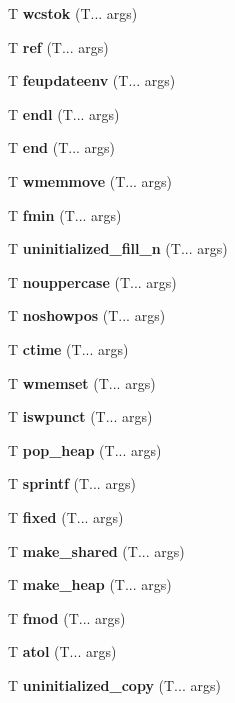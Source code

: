 \begin{DoxyCompactItemize}
T \textbf{ wcstok} (T... args)
\item 
\mbox{\label{ref}} 
T \textbf{ ref} (T... args)
\item 
\mbox{\label{feupdateenv}} 
T \textbf{ feupdateenv} (T... args)
\item 
\mbox{\label{endl}} 
T \textbf{ endl} (T... args)
\item 
\mbox{\label{end}} 
T \textbf{ end} (T... args)
\item 
\mbox{\label{wmemmove}} 
T \textbf{ wmemmove} (T... args)
\item 
\mbox{\label{fmin}} 
T \textbf{ fmin} (T... args)
\item 
\mbox{\label{uninitialized_fill_n}} 
T \textbf{ uninitialized\+\_\+fill\+\_\+n} (T... args)
\item 
\mbox{\label{uppercase}} 
T \textbf{ nouppercase} (T... args)
\item 
\mbox{\label{showpos}} 
T \textbf{ noshowpos} (T... args)
\item 
\mbox{\label{ctime}} 
T \textbf{ ctime} (T... args)
\item 
\mbox{\label{wmemset}} 
T \textbf{ wmemset} (T... args)
\item 
\mbox{\label{iswpunct}} 
T \textbf{ iswpunct} (T... args)
\item 
\mbox{\label{pop_heap}} 
T \textbf{ pop\+\_\+heap} (T... args)
\item 
\mbox{\label{fprintf}} 
T \textbf{ sprintf} (T... args)
\item 
\mbox{\label{fixed}} 
T \textbf{ fixed} (T... args)
\item 
\mbox{\label{make_shared}} 
T \textbf{ make\+\_\+shared} (T... args)
\item 
\mbox{\label{make_heap}} 
T \textbf{ make\+\_\+heap} (T... args)
\item 
\mbox{\label{fmod}} 
T \textbf{ fmod} (T... args)
\item 
\mbox{\label{atoi}} 
T \textbf{ atol} (T... args)
\item 
\mbox{\label{uninitialized_copy}} 
T \textbf{ uninitialized\+\_\+copy} (T... args)
\item 

\end{DoxyCompactItemize}
